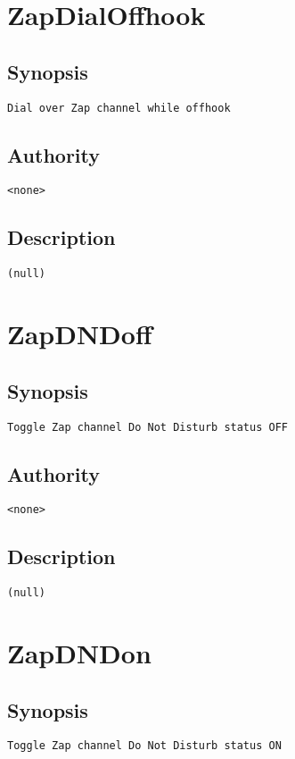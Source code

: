 \section{ZapDialOffhook}
\subsection{Synopsis}
\begin{verbatim}
Dial over Zap channel while offhook
\end{verbatim}
\subsection{Authority}
\begin{verbatim}
<none>
\end{verbatim}
\subsection{Description}
\begin{verbatim}
(null)
\end{verbatim}


\section{ZapDNDoff}
\subsection{Synopsis}
\begin{verbatim}
Toggle Zap channel Do Not Disturb status OFF
\end{verbatim}
\subsection{Authority}
\begin{verbatim}
<none>
\end{verbatim}
\subsection{Description}
\begin{verbatim}
(null)
\end{verbatim}


\section{ZapDNDon}
\subsection{Synopsis}
\begin{verbatim}
Toggle Zap channel Do Not Disturb status ON
\end{verbatim}
